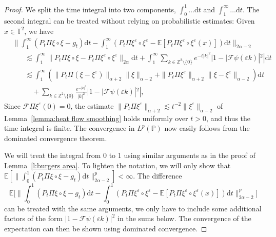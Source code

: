 \documentclass[a4paper,11pt]{article}
\newcommand{\mathd}{\mathrm{d}}
\theoremstyle{remark}
\newcommand{\Z}{\mathbb{Z}}
\newcommand{\E}{\mathbb{E}}
\newcommand{\CF}{\ensuremath{\mathscr{F}}}
\newcommand{\reso}{\,\mathord{\circ}\,}
\begin{document}
\begin{proof}
   We split the time integral into two components, $\int_0^1 \dots \mathd t$ and $\int_1^\infty \dots \mathd t$. The second integral can be treated without relying on probabilistic estimates: Given $x \in \mathbb{T}^2$, we have
   \begin{align*}
      &\bigg\| \int_1^\infty (P_t \Pi \xi \reso \xi - g_t) \mathd t - \int_1^\infty (P_t \Pi \xi^\varepsilon \reso \xi^\varepsilon - \E[P_t \Pi \xi^\varepsilon \reso \xi^\varepsilon(x)]) \mathd t \bigg\|_{2\alpha-2} \\
      &\hspace{20pt}\lesssim \int_1^\infty \| P_t \Pi \xi \reso \xi - P_t \Pi \xi^\varepsilon \reso \xi^\varepsilon \|_{2\alpha} \mathd t + \int_1^\infty \sum_{k \in \Z^2 \setminus\{0\}} e^{-t |k|^2} |1 - |\CF \psi(\varepsilon k)|^2| \mathd t \\
      &\hspace{20pt}\lesssim  \int_1^\infty (\| P_t \Pi(\xi - \xi^\varepsilon) \|_{\alpha + 2} \| \xi \|_{\alpha-2} + \| P_t \Pi \xi^\varepsilon \|_{\alpha + 2} \| \xi - \xi^\varepsilon \|_{\alpha - 2}) \mathd t \\
      &\hspace{20pt}\quad+ \sum_{k \in \Z^2 \setminus\{0\}} \frac{e^{- |k|^2}}{|k|^2} |1 - |\CF \psi(\varepsilon k)|^2|,
   \end{align*}
   Since $\CF \Pi \xi^\varepsilon (0) = 0$, the estimate $\| P_t \Pi \xi^\varepsilon \|_{\alpha + 2} \lesssim t^{-2} \| \xi^\varepsilon \|_{\alpha-2}$ of Lemma~\ref{lemma:heat flow smoothing} holds uniformly over $t > 0$, and thus the time integral is finite. The convergence in $L^p(\mathbb{P})$ now easily follows from the dominated convergence theorem.
   
   We will treat the integral from 0 to 1 using similar arguments as in the proof of Lemma~\ref{l:burgers area}. To lighten the notation, we will only show that $\E[\| \int_0^1 (P_t \Pi \xi \reso \xi - g_t) \mathd t\|_{2\alpha-2}^p]<\infty$. The difference
   \[
      \E\Big[ \Big\| \int_0^1 (P_t \Pi \xi \reso \xi - g_t) \mathd t - \int_0^1 (P_t \Pi \xi^\varepsilon \reso \xi^\varepsilon - \E[P_t \Pi \xi^\varepsilon \reso \xi^\varepsilon(x)]) \mathd t \Big\|_{2\alpha - 2}^p\Big]
   \]
   can be treated with the same arguments, we only have to include some additional factors of the form $|1 - \CF \psi (\varepsilon k)|^2$ in the sums below. The convergence of the expectation can then be shown using dominated convergence.
   

\end{proof}
\end{document}
